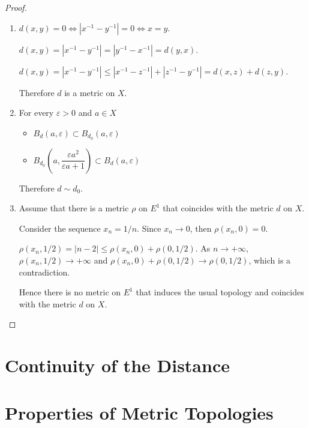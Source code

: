 \begin{proof}
	\begin{enumerate}[label={(\alph*)}]
		\item \( d(x, y) = 0 \iff \left\vert x^{-1} - y^{-1} \right\vert = 0 \iff x = y \).

		      \( d(x, y) = \left\vert x^{-1} - y^{-1} \right\vert = \left\vert y^{-1} - x^{-1} \right\vert = d(y, x) \).

		      \( d(x, y) =  \left\vert x^{-1} - y^{-1} \right\vert \le \left\vert x^{-1} - z^{-1} \right\vert + \left\vert z^{-1} - y^{-1} \right\vert = d(x, z) + d(z, y) \).

		      Therefore \( d \) is a metric on \( X \).
		\item For every \( \varepsilon > 0 \) and \( a \in X \)
		      \begin{itemize}
			      \item \( B_{d}(a, \varepsilon) \subset B_{d_{0}}(a, \varepsilon) \)
			      \item \( B_{d_{0}}\left(a, \dfrac{\varepsilon a^{2}}{\varepsilon a + 1}\right) \subset B_{d}(a, \varepsilon) \)
		      \end{itemize}

		      Therefore \( d \sim d_{0} \).
		\item Assume that there is a metric \( \rho \) on \( E^{1} \) that coincides with the metric \( d \) on \( X \).

		      Consider the sequence \( x_{n} = 1/n \). Since \( x_{n} \to 0 \), then \( \rho(x_{n}, 0) = 0 \).

		      \( \rho(x_{n}, 1/2) = \left\vert n - 2 \right\vert \le \rho(x_{n}, 0) + \rho(0, 1/2) \). As \( n \to +\infty \), \( \rho(x_{n}, 1/2) \to +\infty \) and \( \rho(x_{n}, 0) + \rho(0, 1/2) \to \rho(0, 1/2) \), which is a contradiction.

		      Hence there is no metric on \( E^{1} \) that induces the usual topology and coincides with the metric \( d \) on \( X \).
	\end{enumerate}
\end{proof}

\section{Continuity of the Distance}

\section{Properties of Metric Topologies}

